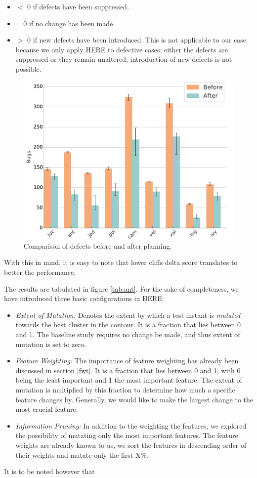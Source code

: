 \documentclass[conference]{IEEEtran}
\newcommand{\bi}{\begin{itemize}}
\newcommand{\ei}{\end{itemize}}
\begin{document}
\bi
\item $\lt$ 0 if defects have been suppressed.
\item = 0 if no change has been made.
\item $\gt$ 0 if new defects have been introduced. This is not applicable to our case because we only apply HERE to defective cases; either the defects are suppressed or they remain unaltered, introduction of new defects is not possible.
\ei


\begin{figure}[tbp]
\centering
\includegraphics[width=\linewidth]{_figs/histograms.pdf}
\caption{Comparison of defects before and after planning.}
\label{fig:bugs}
\end{figure}
With this in mind, it is easy to note that lower cliffs delta score translates to better the performance. 

 
The results are tabulated in figure \ref{tab:ant}. For the sake of completeness, we have introduced three basic configurations in HERE: 
\bi
\item \textit{Extent of Mutation:} Denotes the extent by which a test instant is \textit{mutated} towards the best cluster in the contour. It is a fraction that lies between 0 and 1. The baseline study requires no change be made, and thus extent of mutation is set to zero.
\item \textit{Feature Weighting:} The importance of feature weighting has already been discussed in section \ref{fwt}. It is a fraction that lies between 0 and 1, with 0 being the least important and 1 the most important feature. The extent of mutation is multiplied by this fraction to determine how much a specific feature changes by. Generally, we would like to make the largest change to the most crucial feature.
\item \textit{Information Pruning:} In addition to the weighting the features, we explored the possibility of mutating only the most important features. The feature weights are already known to us, we sort the features in descending order of their weights and mutate only the first X\%.
\ei
It is to be noted however that 
\end{document}
